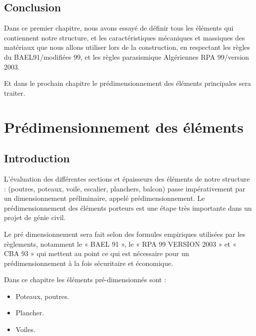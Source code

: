 \documentclass[12pt,a4paper]{report}
\numberwithin{equation}{section}
\begin{document}
	
	
	\section{Conclusion}
	
	Dans ce premier chapitre, nous avons essayé de définir tous les éléments qui contiennent notre
	structure, et les caractéristiques mécaniques et massiques des matériaux que nous allons utiliser
	lors de la construction, en respectant les règles du BAEL91/modifiées 99, et les règles
	parasismique Algériennes RPA 99/version 2003.
	
	\vspace{\baselineskip}
	
	Et dans le prochain chapitre le prédimensionnement des éléments principales sera traiter.


	
	
	\chapter{Prédimensionnement des éléments}
	
	
	\section{Introduction}
	
	L’évaluation des différentes sections et épaisseurs des éléments de notre structure : (poutres,
	poteaux, voile, escalier, planchers, balcon) passe impérativement par un dimensionnement
	préliminaire, appelé prédimensionnement. Le prédimensionnement des éléments porteurs est une
	étape très importante dans un projet de génie civil.
	
	Le pré dimensionnement sera fait selon des formules empiriques utilisées par les règlements,
	notamment le « BAEL 91 », le « RPA 99 VERSION 2003 » et « CBA 93 » qui mettent au point
	ce qui est nécessaire pour un prédimensionnement à la fois sécuritaire et économique.
	
	\vspace{\baselineskip}
	
	Dans ce chapitre les éléments pré-dimensionnés sont :
	
	\begin{itemize}
		\item Poteaux, poutres.
		\item Plancher.
		\item Voiles.
	\end{itemize}
	
\end{document}
